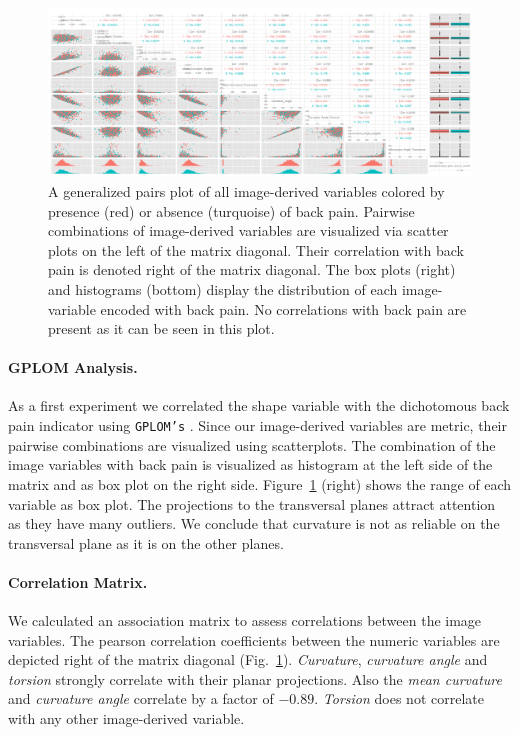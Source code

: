 \documentclass[a4paper,twoside]{style/article}
\begin{document}
\begin{figure}[htb]
  \centering
  \includegraphics[width=1.0\textwidth]{figures/image-parameter-range}
  \caption{%
A generalized pairs plot of all image-derived variables colored by presence (red) or absence (turquoise) of back pain.
Pairwise combinations of image-derived variables are visualized via scatter plots on the left of the matrix diagonal.
Their correlation with back pain is denoted right of the matrix diagonal.
The box plots (right) and histograms (bottom) display the distribution of each image-variable encoded with back pain.
No correlations with back pain are present as it can be seen in this plot.
}
  \label{fig:image-parameter-range}
\end{figure}
\paragraph{GPLOM Analysis.}
As a first experiment we correlated the shape variable with the dichotomous back pain indicator using \texttt{GPLOM's} \cite{GPLOMS}.
Since our image-derived variables are metric, their pairwise combinations are visualized using scatterplots.
The combination of the image variables with back pain is visualized as histogram at the left side of the matrix and as box plot on the right side.
Figure~\ref{fig:image-parameter-range} (right) shows the range of each variable as box plot.
The projections to the transversal planes attract attention as they have many outliers.
We conclude that curvature is not as reliable on the transversal plane as it is on the other planes.
\paragraph{Correlation Matrix.}
We calculated an association matrix to assess correlations between the image variables.
The pearson correlation coefficients between the numeric variables are depicted right of the matrix diagonal (Fig.~\ref{fig:image-parameter-range}).
\emph{Curvature}, \emph{curvature angle} and \emph{torsion} strongly correlate with their planar projections.
Also the \emph{mean curvature} and \emph{curvature angle} correlate by a factor of $-0.89$.
\emph{Torsion} does not correlate with any other image-derived variable.
\end{document}
